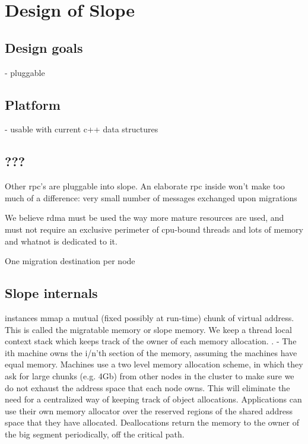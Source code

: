 \chapter{Design of Slope}
\label{chap:design}

\section{Design goals}
- pluggable

\section{Platform}
- usable with current c++ data structures

\section{???}

Other rpc's are pluggable into slope.
An elaborate rpc inside won't make too much of a difference: very small number of messages exchanged upon migrations

We believe rdma must be used the way more mature resources are used, and must not require an exclusive perimeter of cpu-bound threads and lots of memory and whatnot is dedicated to it.

One migration destination per node



\section{Slope internals}

instances mmap a mutual (fixed possibly at run-time) chunk of virtual address. This is called the migratable memory or slope memory.
We keep a thread local context stack which keeps track of the owner of each memory allocation. .
- The ith machine owns the i/n'th section of the memory, assuming the machines have equal memory. Machines use a two level memory
allocation scheme, in which they ask for large chunks (e.g. 4Gb) from other nodes in the cluster to make sure we do not exhaust
the address space that each node owns. This will eliminate the need for a centralized way of keeping track of object allocations.
Applications can use their own memory allocator over the reserved regions of the shared address space that they have allocated.
Deallocations return the memory to the owner of the big segment periodically, off the critical path. 


